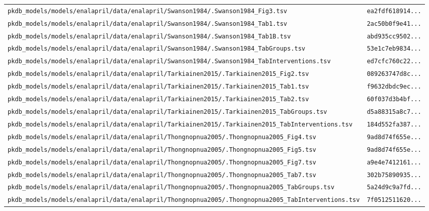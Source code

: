 \documentclass{article}
\begin{document}
\begin{longtable}{ll}
\texttt{pkdb\_models/models/enalapril/data/enalapril/Swanson1984/.Swanson1984\_Fig3.tsv} & \texttt{ea2fdf618914...} \\
\texttt{pkdb\_models/models/enalapril/data/enalapril/Swanson1984/.Swanson1984\_Tab1.tsv} & \texttt{2ac50b0f9e41...} \\
\texttt{pkdb\_models/models/enalapril/data/enalapril/Swanson1984/.Swanson1984\_Tab1B.tsv} & \texttt{abd935cc9502...} \\
\texttt{pkdb\_models/models/enalapril/data/enalapril/Swanson1984/.Swanson1984\_TabGroups.tsv} & \texttt{53e1c7eb9834...} \\
\texttt{pkdb\_models/models/enalapril/data/enalapril/Swanson1984/.Swanson1984\_TabInterventions.tsv} & \texttt{ed7cfc760c22...} \\
\texttt{pkdb\_models/models/enalapril/data/enalapril/Tarkiainen2015/.Tarkiainen2015\_Fig2.tsv} & \texttt{089263747d8c...} \\
\texttt{pkdb\_models/models/enalapril/data/enalapril/Tarkiainen2015/.Tarkiainen2015\_Tab1.tsv} & \texttt{f9632dbdc9ec...} \\
\texttt{pkdb\_models/models/enalapril/data/enalapril/Tarkiainen2015/.Tarkiainen2015\_Tab2.tsv} & \texttt{60f037d3b4bf...} \\
\texttt{pkdb\_models/models/enalapril/data/enalapril/Tarkiainen2015/.Tarkiainen2015\_TabGroups.tsv} & \texttt{d5a88315a8c7...} \\
\texttt{pkdb\_models/models/enalapril/data/enalapril/Tarkiainen2015/.Tarkiainen2015\_TabInterventions.tsv} & \texttt{184d552fa387...} \\
\texttt{pkdb\_models/models/enalapril/data/enalapril/Thongnopnua2005/.Thongnopnua2005\_Fig4.tsv} & \texttt{9ad8d74f655e...} \\
\texttt{pkdb\_models/models/enalapril/data/enalapril/Thongnopnua2005/.Thongnopnua2005\_Fig5.tsv} & \texttt{9ad8d74f655e...} \\
\texttt{pkdb\_models/models/enalapril/data/enalapril/Thongnopnua2005/.Thongnopnua2005\_Fig7.tsv} & \texttt{a9e4e7412161...} \\
\texttt{pkdb\_models/models/enalapril/data/enalapril/Thongnopnua2005/.Thongnopnua2005\_Tab7.tsv} & \texttt{302b75890935...} \\
\texttt{pkdb\_models/models/enalapril/data/enalapril/Thongnopnua2005/.Thongnopnua2005\_TabGroups.tsv} & \texttt{5a24d9c9a7fd...} \\
\texttt{pkdb\_models/models/enalapril/data/enalapril/Thongnopnua2005/.Thongnopnua2005\_TabInterventions.tsv} & \texttt{7f0512511620...} \\

\end{longtable}
\end{document}
